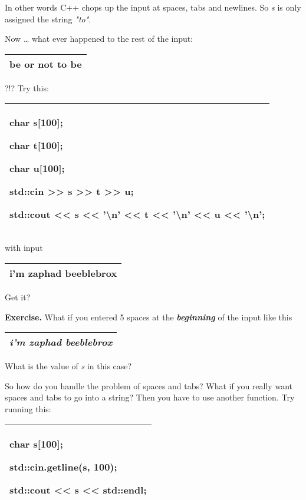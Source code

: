 \documentclass[
]{article}
\begin{document}
In other words C++ chops up the input at spaces, tabs and newlines. So
\emph{s} is only assigned the string \emph{"to"}.

Now \ldots{} what ever happened to the rest of the input:

\begin{longtable}[]{@{}l@{}}
\toprule
\endhead
be or not to be\tabularnewline
\bottomrule
\end{longtable}

?!? Try this:

\begin{longtable}[]{@{}l@{}}
\toprule
\endhead
\begin{minipage}[t]{0.97\columnwidth}\raggedright
char s{[}100{]};

char t{[}100{]};

char u{[}100{]};

std::cin \textgreater\textgreater{} s \textgreater\textgreater{} t
\textgreater\textgreater{} u;

std::cout \textless\textless{} s \textless\textless{} '\textbackslash n'
\textless\textless{} t \textless\textless{} '\textbackslash n'
\textless\textless{} u \textless\textless{} '\textbackslash n';\strut
\end{minipage}\tabularnewline
\bottomrule
\end{longtable}

with input

\begin{longtable}[]{@{}l@{}}
\toprule
\endhead
i'm zaphad beeblebrox\tabularnewline
\bottomrule
\end{longtable}

Get it?

\textbf{Exercise.} What if you entered 5 spaces at the
\emph{\textbf{beginning}} of the input like this

\begin{longtable}[]{@{}l@{}}
\toprule
\endhead
\emph{ \textbf{i'm zaphad beeblebrox}}\tabularnewline
\bottomrule
\end{longtable}

What is the value of \emph{s} in this case?

So how do you handle the problem of spaces and tabs? What if you really
want spaces and tabs to go into a string? Then you have to use another
function. Try running this:

\begin{longtable}[]{@{}l@{}}
\toprule
\endhead
\begin{minipage}[t]{0.97\columnwidth}\raggedright
char s{[}100{]};

std::cin.getline(s, 100);

std::cout \textless\textless{} s \textless\textless{} std::endl;\strut
\end{minipage}\tabularnewline
\bottomrule
\end{longtable}
\end{document}
